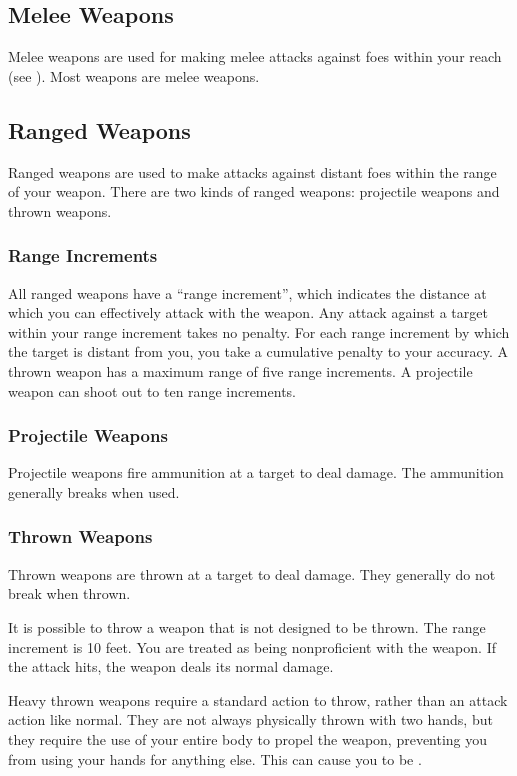 
    \subsection{Melee Weapons}
        Melee weapons are used for making melee attacks against foes within your reach (see ). Most weapons are melee weapons.

    \subsection{Ranged Weapons}
        Ranged weapons are used to make attacks against distant foes within the range of your weapon. There are two kinds of ranged weapons: projectile weapons and thrown weapons.

        \subsubsection{Range Increments}\label{Range Increment} All ranged weapons have a ``range increment'', which indicates the distance at which you can effectively attack with the weapon. Any attack against a target within your range increment takes no penalty. For each range increment by which the target is distant from you, you take a cumulative  penalty to your accuracy. A thrown weapon has a maximum range of five range increments. A projectile weapon can shoot out to ten range increments.

        \subsubsection{Projectile Weapons} Projectile weapons fire ammunition at a target to deal damage. The ammunition generally breaks when used.

        \subsubsection{Thrown Weapons}\label{Thrown Weapons} Thrown weapons are thrown at a target to deal damage. They generally do not break when thrown.

             It is possible to throw a weapon that is not designed to be thrown. The range increment is 10 feet. You are treated as being nonproficient with the weapon. If the attack hits, the weapon deals its normal damage.

             Heavy thrown weapons require a standard action to throw, rather than an attack action like normal.
            They are not always physically thrown with two hands, but they require the use of your entire body to propel the weapon, preventing you from using your hands for anything else.
            This can cause you to be .


